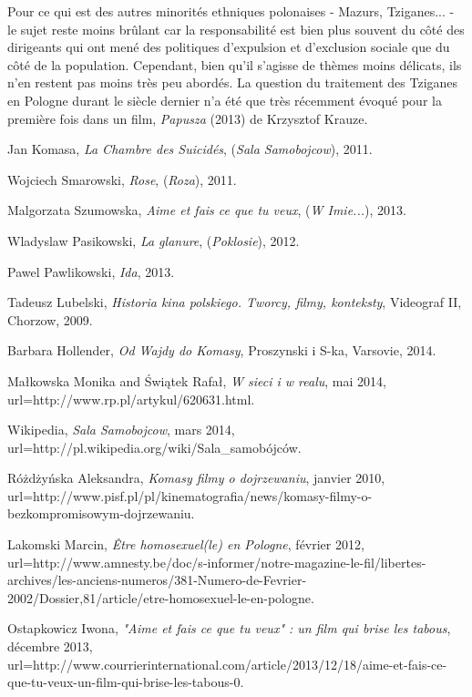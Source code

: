 \documentclass[12pt, twocolumn]{amsart}
\begin{document}
Pour ce qui est des autres minorités ethniques polonaises - Mazurs, Tziganes... - le sujet reste moins brûlant car la responsabilité est bien plus souvent du côté des dirigeants qui ont mené des politiques d'expulsion et d'exclusion sociale que du côté de la population. Cependant, bien qu'il s'agisse de thèmes moins délicats, ils n'en restent pas moins très peu abordés. La question du traitement des Tziganes en Pologne durant le siècle dernier n'a été que très récemment évoqué pour la première fois dans un film, \emph{Papusza} (2013) de Krzysztof Krauze. 

\clearpage
\onecolumn
\begin{thebibliography}{100}

	Jan Komasa,
	\emph{La Chambre des Suicidés},
	(\emph{Sala Samobojcow}),
	2011.
	
	Wojciech Smarowski,
	\emph{Rose},
	(\emph{Roza}),
	2011.
	
	Malgorzata Szumowska,
	\emph{Aime et fais ce que tu veux},
	(\emph{W Imie...}),
	2013.
	
	Wladyslaw Pasikowski,
	\emph{La glanure},
	(\emph{Poklosie}),
	2012.
	
	Pawel Pawlikowski,
	\emph{Ida},
	2013.

	Tadeusz Lubelski, 
	\emph{Historia kina polskiego. Tworcy, filmy, konteksty},
	Videograf II,
	Chorzow,
	2009.
	 
	Barbara Hollender,
	\emph{Od Wajdy do Komasy},
	Proszynski i S-ka,
	Varsovie,
	2014.
	
	Małkowska Monika and Świątek Rafał,
	\emph{W sieci i w realu},
	mai 2014,
	url=http://www.rp.pl/artykul/620631.html.

	Wikipedia,
	\emph{Sala Samobojcow},
	mars 2014,
	url=http://pl.wikipedia.org/wiki/Sala\_samobójców.


	Różdżyńska Aleksandra,
	\emph{Komasy filmy o dojrzewaniu},
	janvier 2010,
	url=http://www.pisf.pl/pl/kinematografia/news/komasy-filmy-o-bezkompromisowym-dojrzewaniu.


	Lakomski Marcin,
	\emph{Être homosexuel(le) en Pologne},
	février 2012,
	url=http://www.amnesty.be/doc/s-informer/notre-magazine-le-fil/libertes-archives/les-anciens-numeros/381-Numero-de-Fevrier-2002/Dossier,81/article/etre-homosexuel-le-en-pologne.

	Ostapkowicz Iwona,
	\emph{"Aime et fais ce que tu veux" : un film qui brise les tabous},
	décembre 2013,
	url=http://www.courrierinternational.com/article/2013/12/18/aime-et-fais-ce-que-tu-veux-un-film-qui-brise-les-tabous-0.


\end{thebibliography}
\end{document}
